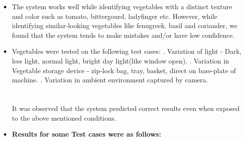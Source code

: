 \documentclass[a4paper,12pt,oneside]{book}
\begin{document}
\begin{itemize}
	\item The system works well while identifying vegetables with a distinct texture and color such as tomato, bittergourd, ladyfinger etc. However, while identifying similar-looking vegetables like fenugreek, basil and coriander, we found that the system tends to make mistakes and/or have low confidence.
	\item Vegetables were tested on the following test cases:
	. Variation of light - Dark, less light, normal light, bright day light(like window open).
	. Variation in Vegetable storage device - zip-lock bag, tray, basket, direct on base-plate of machine.
	. Variation in ambient environment captured by camera.\\\\\\	
	  It was observed that the system predicted correct results even when exposed to the above mentioned conditions.
	  \newpage
	  \item \Large\textbf{Results for some Test cases were as follows:}
	  

\end{itemize}
\end{document}
